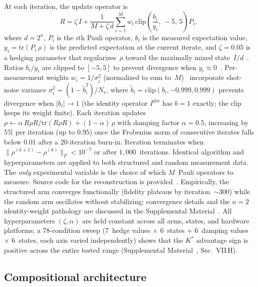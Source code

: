 \documentclass[twocolumn,prx,aps,superscriptaddress,longbibliography,floatfix]{revtex4-2}
\begin{document}
At each iteration, the update operator is
\begin{equation}\label{eq:mle}
  R = \zeta\, I + \frac{1}{M + \zeta\, d}
  \sum_{i=1}^{M} w_i\,
  \mathrm{clip}\!\left(\frac{b_i}{y_i},\, -5,\, 5\right) P_i,
\end{equation}
where $d = 2^n$, $P_i$ is the $i$th Pauli operator,
$b_i$ is the measured expectation value,
$y_i = \mathrm{tr}(P_i\,\rho)$ is the predicted expectation at the
current iterate, and
$\zeta = 0.05$ is a hedging parameter that regularizes~$\rho$
toward the maximally mixed state~$I/d$~\cite{Blume-Kohout2010}.
Ratios $b_i/y_i$ are clipped to $[-5, 5]$ to prevent divergence
when $y_i \approx 0$~\cite{Hradil1997,Paris2004}.
Per-measurement
weights $w_i = 1/\sigma_i^2$ (normalized to sum to~$M$)~\cite{Smolin2012}
incorporate shot-noise variance $\sigma_i^2 = (1 - \tilde{b}_i^2)/N_s$,
where $\tilde{b}_i = \mathrm{clip}(b_i, -0.999, 0.999)$ prevents
divergence when $|b_i| \to 1$ (the identity operator $I^{\otimes n}$
has $b = 1$ exactly; the clip keeps its weight finite).
Each iteration updates
$\rho \leftarrow \alpha\, R\rho R / \mathrm{tr}(R\rho R) +
(1 - \alpha)\,\rho$ with damping factor $\alpha = 0.5$,
increasing by $5$\% per iteration (up to $0.95$) once the
Frobenius norm of consecutive iterates falls below $0.01$ after a
$20$-iteration burn-in.  Iteration
terminates when $\|\rho^{(k+1)} - \rho^{(k)}\|_F < 10^{-7}$ or
after $1{,}000$~iterations.
Identical algorithm and hyperparameters are applied to both
structured and random measurement data.  The \emph{only} experimental
variable is the choice of which $M$~Pauli operators to measure.
Source code for the reconstruction is provided~\cite{supplemental}.
Empirically, the structured arm converges functionally (fidelity
plateaus by iteration~${\sim}300$) while the random arm oscillates
without stabilizing; convergence details and the
$n = 2$ identity-weight pathology are discussed in the Supplemental Material~\cite{supplemental}.
All hyperparameters $(\zeta, \alpha)$ are held constant across
all arms, states, and hardware platforms; a $78$-condition sweep
(7~hedge values $\times$ 6~states + 6~damping values $\times$ 6~states,
each axis varied independently) shows
that the $K^*$ advantage sign is positive across the entire tested
range (Supplemental Material~\cite{supplemental}, Sec.~VII\,H).

\subsection{Compositional architecture}
\label{sec:compositional}
\end{document}
